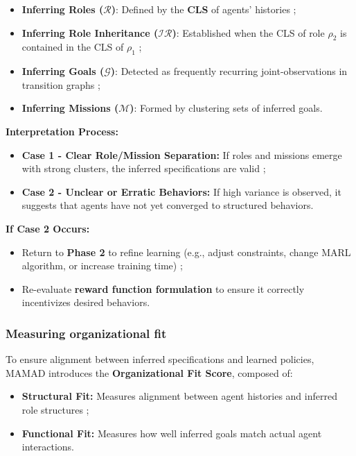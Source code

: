 \documentclass[pdflatex,sn-mathphys-num]{sn-jnl}%
\theoremstyle{thmstyleone}%
\theoremstyle{thmstyletwo}%
\theoremstyle{thmstylethree}%
\begin{document}
\begin{itemize}
    \item \textbf{Inferring Roles ($\mathcal{R}$)}: Defined by the \textbf{CLS} of agents' histories ;
    \item \textbf{Inferring Role Inheritance ($\mathcal{IR}$)}: Established when the CLS of role $\rho_2$ is contained in the CLS of $\rho_1$ ;
    \item \textbf{Inferring Goals ($\mathcal{G}$)}: Detected as frequently recurring joint-observations in transition graphs ;
    \item \textbf{Inferring Missions ($\mathcal{M}$)}: Formed by clustering sets of inferred goals.
\end{itemize}

\noindent \textbf{Interpretation Process:}
\begin{itemize}
    \item \textbf{Case 1 - Clear Role/Mission Separation:} If roles and missions emerge with strong clusters, the inferred specifications are valid ;
    \item \textbf{Case 2 - Unclear or Erratic Behaviors:} If high variance is observed, it suggests that agents have not yet converged to structured behaviors.
\end{itemize}

\noindent \textbf{If Case 2 Occurs:}
\begin{itemize}
    \item Return to \textbf{Phase 2} to refine learning (e.g., adjust constraints, change MARL algorithm, or increase training time) ;
    \item Re-evaluate \textbf{reward function formulation} to ensure it correctly incentivizes desired behaviors.
\end{itemize}

\subsubsection{Measuring organizational fit}
To ensure alignment between inferred specifications and learned policies, MAMAD introduces the \textbf{Organizational Fit Score}, composed of:

\begin{itemize}
    \item \textbf{Structural Fit:} Measures alignment between agent histories and inferred role structures ;
    \item \textbf{Functional Fit:} Measures how well inferred goals match actual agent interactions.
\end{itemize}
\end{document}
